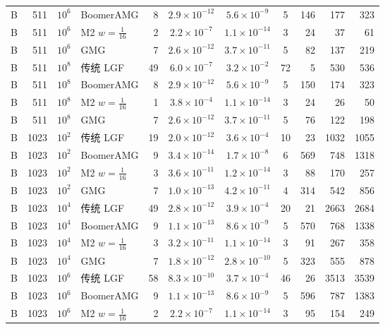 \begin{longtable}{lrrlrcccrrr}
B & 511 & $10^{6}$ & BoomerAMG & 8 & $2.9{\times}10^{-12}$ & $5.6{\times}10^{-9}$ & 5 & 146 & 177 & 323 \\
B & 511 & $10^{6}$ & M2 $w{=}\frac1{16}$ & 2 & $2.2{\times}10^{-7}$ & $1.1{\times}10^{-14}$ & 3 & 24 & 37 & 61 \\
B & 511 & $10^{6}$ & GMG & 7 & $2.6{\times}10^{-12}$ & $3.7{\times}10^{-11}$ & 5 & 82 & 137 & 219 \\
B & 511 & $10^{8}$ & 传统 LGF & 49 & $6.0{\times}10^{-7}$ & $3.2{\times}10^{-2}$ & 72 & 5 & 530 & 536 \\
B & 511 & $10^{8}$ & BoomerAMG & 8 & $2.9{\times}10^{-12}$ & $5.6{\times}10^{-9}$ & 5 & 150 & 174 & 323 \\
B & 511 & $10^{8}$ & M2 $w{=}\frac1{16}$ & 1 & $3.8{\times}10^{-4}$ & $1.1{\times}10^{-14}$ & 3 & 24 & 26 & 50 \\
B & 511 & $10^{8}$ & GMG & 7 & $2.6{\times}10^{-12}$ & $3.7{\times}10^{-11}$ & 5 & 76 & 122 & 198 \\
B & 1023 & $10^{2}$ & 传统 LGF & 19 & $2.0{\times}10^{-12}$ & $3.6{\times}10^{-4}$ & 10 & 23 & 1032 & 1055 \\
B & 1023 & $10^{2}$ & BoomerAMG & 9 & $3.4{\times}10^{-14}$ & $1.7{\times}10^{-8}$ & 6 & 569 & 748 & 1318 \\
B & 1023 & $10^{2}$ & M2 $w{=}\frac1{16}$ & 3 & $3.6{\times}10^{-11}$ & $1.2{\times}10^{-14}$ & 3 & 88 & 170 & 257 \\
B & 1023 & $10^{2}$ & GMG & 7 & $1.0{\times}10^{-13}$ & $4.2{\times}10^{-11}$ & 4 & 314 & 542 & 856 \\
B & 1023 & $10^{4}$ & 传统 LGF & 49 & $2.8{\times}10^{-12}$ & $3.9{\times}10^{-4}$ & 20 & 21 & 2663 & 2684 \\
B & 1023 & $10^{4}$ & BoomerAMG & 9 & $1.1{\times}10^{-13}$ & $8.6{\times}10^{-9}$ & 5 & 570 & 768 & 1338 \\
B & 1023 & $10^{4}$ & M2 $w{=}\frac1{16}$ & 3 & $3.2{\times}10^{-11}$ & $1.1{\times}10^{-14}$ & 3 & 91 & 267 & 358 \\
B & 1023 & $10^{4}$ & GMG & 7 & $1.8{\times}10^{-12}$ & $2.8{\times}10^{-10}$ & 5 & 323 & 555 & 878 \\
B & 1023 & $10^{6}$ & 传统 LGF & 58 & $8.3{\times}10^{-10}$ & $3.7{\times}10^{-4}$ & 46 & 26 & 3513 & 3539 \\
B & 1023 & $10^{6}$ & BoomerAMG & 9 & $1.1{\times}10^{-13}$ & $8.6{\times}10^{-9}$ & 5 & 596 & 787 & 1383 \\
B & 1023 & $10^{6}$ & M2 $w{=}\frac1{16}$ & 2 & $2.2{\times}10^{-7}$ & $1.1{\times}10^{-14}$ & 3 & 95 & 154 & 249 \\

\end{longtable}

